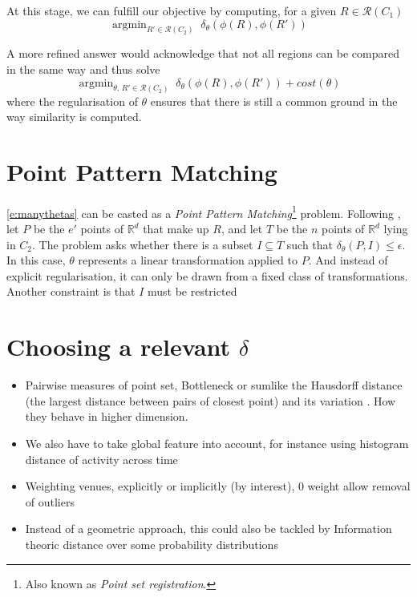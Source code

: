 \documentclass[a4paper,11pt,draft]{scrartcl}
\DeclareMathOperator*{\argmin}{argmin}
\newcommand{\autocite}[1]{}
\begin{document}
\medskip

At this stage, we can fulfill our objective by computing, for a given $R \in
\mathcal{R}(C_1)$
\begin{equation}
    \argmin_{R' \in \mathcal{R}(C_2)}\; \delta_{\theta}
    \left(\phi(R), \phi(R')\right)
    \label{e:onetheta}
\end{equation}

A more refined answer would acknowledge that not all regions can be compared in
the same way and thus solve
\begin{equation}
    \argmin_{\theta ,\, R' \in \mathcal{R}(C_2)}\; \delta_{\theta}
    \left(\phi(R), \phi(R')\right) + cost(\theta)
    \label{e:manythetas}
\end{equation}
where the regularisation of $\theta$ ensures that there is still a common
ground in the way similarity is computed.

\section*{Point Pattern Matching}

\eqref{e:manythetas} can be casted as a \emph{Point Pattern
Matching}\footnote{Also known as \emph{Point set registration}.} problem.
Following \autocite{PointPatternMatching08}, let $P$ be the $e'$ points of
$\mathbb{R}^d$ that make up $R$, and let $T$ be the $n$ points of
$\mathbb{R}^d$ lying in $C_2$. The problem asks whether there is a subset $I
\subseteq T$ such that $\delta_{\theta}\left(P, I\right) \leq \epsilon$. In
this case, $\theta$ represents a linear transformation applied to $P$. And
instead of explicit regularisation, it can only be drawn from a fixed class of
transformations. Another constraint is that $I$ must be restricted

\section*{Choosing a relevant $\delta$}

\begin{itemize}
\item Pairwise measures of point set, Bottleneck or sumlike the Hausdorff distance (the largest
distance between pairs of closest point) and its variation\autocite{ModifiedHausdorff94} . How they behave in higher dimension.
\item We also have to take global feature into account, for instance using histogram
distance of activity across time
\item Weighting venues, explicitly or implicitly (by interest), 0 weight allow
removal of outliers
\item Instead of a geometric approach, this could also be tackled by Information
theoric distance over some probability distributions
\end{itemize}
\end{document}

